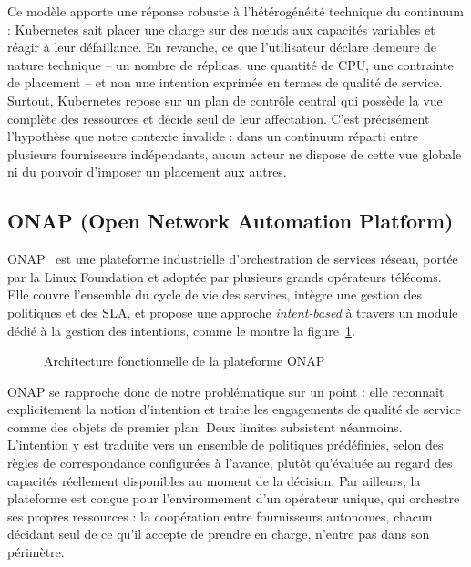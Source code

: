 Ce modèle apporte une réponse robuste à l'hétérogénéité technique du continuum : Kubernetes sait placer une charge sur des nœuds aux capacités variables et réagir à leur défaillance. En revanche, ce que l'utilisateur déclare demeure de nature technique -- un nombre de réplicas, une quantité de CPU, une contrainte de placement -- et non une intention exprimée en termes de qualité de service. Surtout, Kubernetes repose sur un plan de contrôle central qui possède la vue complète des ressources et décide seul de leur affectation. C'est précisément l'hypothèse que notre contexte invalide : dans un continuum réparti entre plusieurs fournisseurs indépendants, aucun acteur ne dispose de cette vue globale ni du pouvoir d'imposer un placement aux autres.

\subsection{ONAP (Open Network Automation Platform)}
\label{sec:etat-art-onap}

ONAP~\cite{website:onap} est une plateforme industrielle d'orchestration de services réseau, portée par la Linux Foundation et adoptée par plusieurs grands opérateurs télécoms. Elle couvre l'ensemble du cycle de vie des services, intègre une gestion des politiques et des SLA, et propose une approche \emph{intent-based} à travers un module dédié à la gestion des intentions, comme le montre la figure~\ref{fig:onap}.

\begin{figure}[H]
    \centering
    \caption{Architecture fonctionnelle de la plateforme ONAP}
    \label{fig:onap}
\end{figure}

ONAP se rapproche donc de notre problématique sur un point : elle reconnaît explicitement la notion d'intention et traite les engagements de qualité de service comme des objets de premier plan. Deux limites subsistent néanmoins. L'intention y est traduite vers un ensemble de politiques prédéfinies, selon des règles de correspondance configurées à l'avance, plutôt qu'évaluée au regard des capacités réellement disponibles au moment de la décision. Par ailleurs, la plateforme est conçue pour l'environnement d'un opérateur unique, qui orchestre ses propres ressources : la coopération entre fournisseurs autonomes, chacun décidant seul de ce qu'il accepte de prendre en charge, n'entre pas dans son périmètre.

